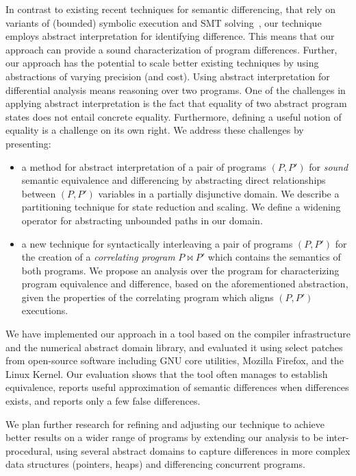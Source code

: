 In contrast to existing recent techniques for semantic differencing, that rely on variants of (bounded) symbolic execution and SMT solving~\cite{DwyerElbaumPerson08,GodlinStrichman09,EnglerRamos11,HawblitzelKawaguchiLahiriRebelo12}, our technique employs abstract interpretation for identifying difference. This means that our approach can provide a sound characterization of program differences. Further, our approach has the potential to scale better existing techniques by using abstractions of varying precision (and cost). Using abstract interpretation for differential analysis means reasoning over two programs. One of the challenges in applying abstract interpretation is the fact that equality of two abstract program states does not entail concrete equality. Furthermore, defining a useful notion of equality is a challenge on its own right. 
We address these challenges by presenting:
\begin{itemize}
\item a method for abstract interpretation of a pair of programs $(P,P')$ for \emph{sound} semantic equivalence and differencing by abstracting direct relationships between $(P,P')$ variables in a partially disjunctive domain. We describe a partitioning technique for state reduction and scaling. We define a widening operator for abstracting unbounded paths in our domain.
\item a new technique for syntactically interleaving a pair of programs $(P,P')$ for the creation of a \emph{correlating program} $P \bowtie P'$ which contains the semantics of both programs. We propose an analysis over the program for characterizing program equivalence and difference, based on the aforementioned abstraction, given the properties of the correlating program which aligns $(P,P')$ executions.
\end{itemize}

We have implemented our approach in a tool based on the  compiler infrastructure and the  numerical abstract domain library, and evaluated it using select patches from open-source software including GNU core utilities, Mozilla Firefox, and the Linux Kernel. Our evaluation shows that the tool often manages to establish equivalence, reports useful approximation of semantic differences when differences exists, and reports only a few false differences.

We plan further research for refining and adjusting our technique to achieve better results on a wider range of programs by extending our analysis to be inter-procedural, using several abstract domains to capture differences in more complex data structures (pointers, heaps) and differencing concurrent programs.

